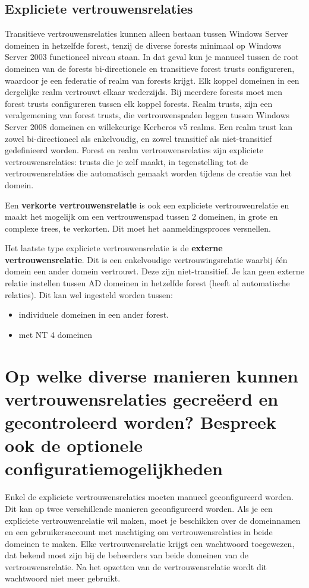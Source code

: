 \subsection{Expliciete vertrouwensrelaties}

Transitieve vertrouwensrelaties kunnen alleen bestaan tussen Windows Server
domeinen in hetzelfde forest, tenzij de diverse forests minimaal op Windows
Server 2003 functioneel niveau staan. In dat geval kun je manueel tussen de root
domeinen van de forests bi-directionele en transitieve forest trusts
configureren, waardoor je een federatie of realm van forests krijgt. Elk koppel
domeinen in een dergelijke realm vertrouwt elkaar wederzijds. Bij meerdere
forests moet men forest trusts configureren tussen elk koppel forests.
Realm trusts, zijn een veralgemening van forest trusts, die vertrouwenspaden
leggen tussen Windows Server 2008 domeinen en willekeurige Kerberos v5 realms.
Een realm trust kan zowel bi-directioneel als enkelvoudig, en zowel transitief
als niet-transitief gedefinieerd worden.
Forest en realm vertrouwensrelaties zijn expliciete vertrouwensrelaties: trusts
die je zelf maakt, in tegenstelling tot de vertrouwensrelaties die automatisch
gemaakt worden tijdens de creatie van het domein.

Een \textbf{verkorte vertrouwensrelatie} is ook een expliciete vertrouwenrelatie 
en maakt het mogelijk om een vertrouwenspad tussen 2 domeinen, in grote en 
complexe trees, te verkorten. Dit moet het aanmeldingsproces versnellen.

Het laatste type expliciete vertrouwensrelatie is de 
\textbf{externe vertrouwensrelatie}. Dit is een enkelvoudige vertrouwingsrelatie 
waarbij één domein een ander domein vertrouwt. Deze zijn niet-transitief. Je kan 
geen externe relatie instellen tussen AD domeinen in hetzelfde forest (heeft al 
automatische relaties). Dit kan wel ingesteld worden tussen:
\begin{itemize}
	\item individuele domeinen in een ander forest.
	\item met NT 4 domeinen
\end{itemize}

\section{Op welke diverse manieren kunnen vertrouwensrelaties gecreëerd en
gecontroleerd worden? Bespreek ook de optionele configuratiemogelijkheden}

Enkel de expliciete vertrouwensrelaties moeten manueel geconfigureerd worden.
Dit kan op twee verschillende manieren geconfigureerd worden. Als je een
expliciete vertrouwenrelatie wil maken, moet je beschikken over de domeinnamen
en een gebruikersaccount met machtiging om vertrouwensrelaties in beide domeinen
te maken. Elke vertrouwensrelatie krijgt een wachtwoord toegewezen, dat bekend
moet zijn bij de beheerders van beide domeinen van de vertrouwensrelatie. Na het
opzetten van de vertrouwensrelatie wordt dit wachtwoord niet meer gebruikt.

